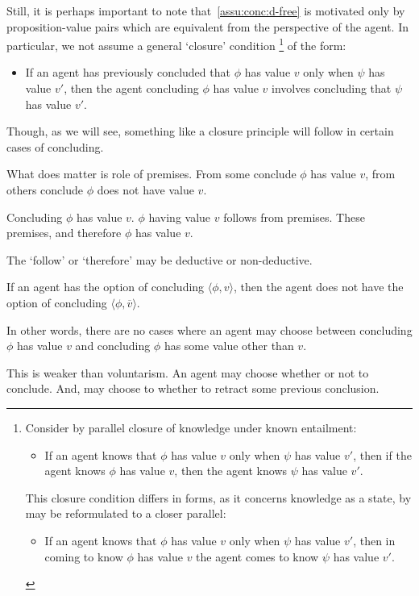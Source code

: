 \begin{note}[Descriptions]
  Still, it is perhaps important to note that~\autoref{assu:conc:d-free} is motivated only by proposition-value pairs which are equivalent from the perspective of the agent.
  In particular, we not assume a general `closure' condition%
  \footnote{
    Consider by parallel closure of knowledge under known entailment:
    \begin{itemize}
    \item If an agent knows that \(\phi\) has value \(v\) only when \(\psi\) has value \(v'\), then if the agent knows \(\phi\) has value \(v\), then the agent knows \(\psi\) has value \(v'\).
    \end{itemize}
    This closure condition differs in forms, as it concerns knowledge as a state, by may be reformulated to a closer parallel:
        \begin{itemize}
    \item If an agent knows that \(\phi\) has value \(v\) only when \(\psi\) has value \(v'\), then in coming to know \(\phi\) has value \(v\) the agent comes to know \(\psi\) has value \(v'\).
    \end{itemize}
  }
  of the form:
  \begin{itemize}
  \item If an agent has previously concluded that \(\phi\) has value \(v\) only when \(\psi\) has value \(v'\), then the agent concluding \(\phi\) has value \(v\) involves concluding that \(\psi\) has value \(v'\).
  \end{itemize}

  Though, as we will see, something like a closure principle will follow in certain cases of concluding.
\end{note}

\begin{note}
  What does matter is role of premises.
  From some conclude \(\phi\) has value \(v\), from others conclude \(\phi\) does not have value \(v\).
\end{note}

\begin{note}[Generally]
  Concluding \(\phi\) has value \(v\).
  \(\phi\) having value \(v\) follows from premises.
  These premises, and therefore \(\phi\) has value \(v\).

  The `follow' or `therefore' may be deductive or non-deductive.
\end{note}

\begin{note}[Unique]
  \begin{assumption}
    \label{assu:conc:unique}
    If an agent has the option of concluding \(\langle \phi,v \rangle\), then the agent does not have the option of concluding \(\langle \phi,\overline{v} \rangle\).
  \end{assumption}
  In other words, there are no cases where an agent may choose between concluding \(\phi\) has value \(v\) and concluding \(\phi\) has some value other than \(v\).

  This is weaker than voluntarism.
  An agent may choose whether or not to conclude.
  And, may choose to whether to retract some previous conclusion.
\end{note}

